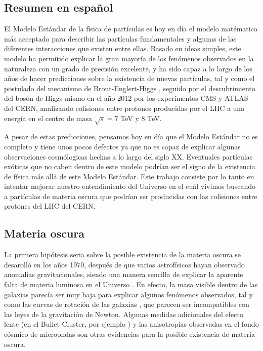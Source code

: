 \documentclass[a4paper, 10pt, openright]{report}
\begin{document}
\begin{appendices}

\chapter{Resumen en espa\~{n}ol} \label{appendix:Resumen}

El Modelo Est\'{a}ndar de la f\'{i}sica de part\'{i}culas \cite{SM} es hoy en d\'{i}a el modelo mat\'{e}matico m\'{a}s acceptado para describir las part\'{i}culas fundamentales y algunas de las diferentes interacciones que existen entre ellas. Basado en ideas simples, este modelo ha permitido explicar la gran mayor\'{i}a de los fen\'{o}menos observados en la naturaleza con un grado de precisi\'{o}n excelente, y ha sido capaz a lo largo de los a\~{n}os de hacer predicciones sobre la existencia de nuevas part\'{i}culas, tal y como el postulado del mecanismo de Brout-Englert-Higgs \cite{HiggsPostulate1, HiggsPostulate2}, seguido por el descubrimiento del bos\'{o}n de Higgs mismo en el a\~{n}o 2012 \cite{HiggsDiscovery1, HiggsDiscovery2} por los experimentos \ac{CMS} \cite{CMS} y \ac{ATLAS} \cite{ATLAS} del \ac{CERN}, analizando colisiones entre protones producidas por el \ac{LHC} a una energ\'{i}a en el centro de masa $\sqrt{s} = 7$ TeV y $8$ TeV.

A pesar de estas predicciones, pensamos hoy en d\'{i}a que el Modelo Est\'{a}ndar no es completo y tiene unos pocos defectos ya que no es capaz de explicar algunas observaciones cosm\'{o}logicas hechas a lo largo del siglo XX. Eventuales part\'{i}culas ex\'{o}ticas que no caben dentro de este modelo podr\'{i}an ser el signo de la existencia de f\'{i}sica m\'{a}s all\'{a} de este Modelo Est\'{a}ndar. Este trabajo consiste por lo tanto en intentar mejorar nuestro entendimiento del Universo en el cu\'{a}l vivimos buscando a part\'{i}culas de materia oscura que podr\'{i}an ser producidas con las colisiones entre protones del \acf{LHC} del \ac{CERN}.

\section{Materia oscura}

La primera hip\'{o}tesis seria sobre la posible existencia de la materia oscura se desaroll\'{o} en los a\~{n}os 1970, despu\'{e}s de que varios astrof\'{i}sicos hayan observado anomal\'{i}as gravitacionales, siendo una manera sencilla de explicar la aparente falta de materia luminosa en el Universo \cite{FirstEvidence}. En efecto, la masa visible dentro de las galaxias parec\'{i}a ser muy baja para explicar algunos fen\'{o}menos observados, tal y como las curvas de rotaci\'{o}n de las galaxias \cite{RotationCurves}, que parecen ser incompatibles con las leyes de la gravitaci\'{o}n de Newton. Algunas medidas adicionales del efecto lente (en el Bullet Cluster, por ejemplo \cite{BulletCluster}) y las anisotropias observadas en el fondo c\'{o}smico de microondas \cite{CMBAnisotropies} son otras evidencias para la posible existencia de materia oscura.


\end{appendices}
\end{document}
